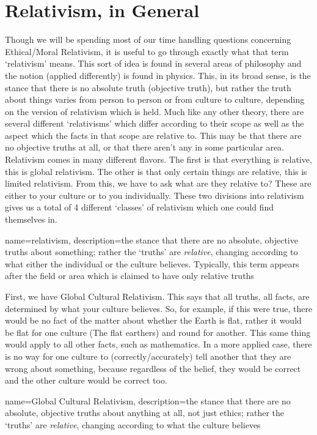 \section{Relativism, in General}

Though we will be spending most of our time handling questions concerning Ethical/Moral Relativism, it is useful to go through exactly what that term `\Gls{relativism}' means. This sort of idea is found in several areas of philosophy and the notion (applied differently) is found in physics. This, in its broad sense, is the stance that there is no absolute truth (objective truth), but rather the truth about things varies from person to person or from culture to culture, depending on the version of relativism which is held. Much like any other theory, there are several different `relativisms' which differ according to their scope as well as the aspect which the facts in that scope are relative to.  This may be that there are no objective truths at all, or that there aren’t any in some particular area. Relativism comes in many different flavors. The first is that everything is relative, this is global relativism. The other is that only certain things are relative, this is limited relativism. From this, we have to ask what are they relative to? These are either to your culture or to you individually. These two divisions into relativism gives us a total of 4 different `classes' of relativism which one could find themselves in.

{
  name=relativism,
  description={the stance that there are no absolute, objective truths about something; rather the `truths' are \emph{relative}, changing according to what either the individual or the culture believes. Typically, this term appears after the field or area which is claimed to have only relative truths}
}


First, we have \gls{Global Cultural Relativism}. This says that all truths, all facts, are determined by what your culture believes. So, for example, if this were true, there would be no fact of the matter about whether the Earth is flat, rather it would be flat for one culture (The flat earthers) and round for another. This same thing would apply to all other facts, such as mathematics. In a more applied case, there is no way for one culture to (correctly/accurately) tell another that they are wrong about something, because regardless of the belief, they would be correct and the other culture would be correct too.

{
  name=Global Cultural Relativism,
  description={the stance that there are no absolute, objective truths about anything at all, not just ethics; rather the `truths' are \emph{relative}, changing according to what the culture believes}
}


